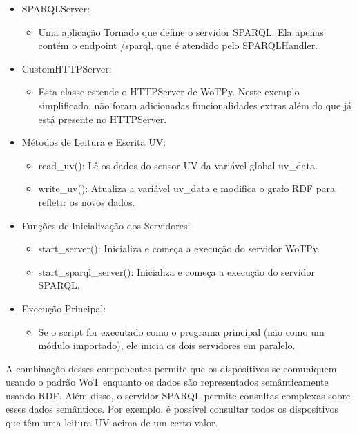 \begin{itemize}
\begin{itemize}
        \end{itemize}
    \item SPARQLServer:
        \begin{itemize}
            \item Uma aplicação Tornado que define o servidor SPARQL. Ela apenas contém o endpoint /sparql, que é atendido pelo SPARQLHandler.
        \end{itemize}
    \item CustomHTTPServer:
        \begin{itemize}
            \item Esta classe estende o HTTPServer de WoTPy. Neste exemplo simplificado, não foram adicionadas funcionalidades extras além do que já está presente no HTTPServer.
        \end{itemize}
    \item Métodos de Leitura e Escrita UV:
        \begin{itemize}
            \item read\_uv(): Lê os dados do sensor UV da variável global uv\_data.
            \item write\_uv(): Atualiza a variável uv\_data e modifica o grafo RDF para refletir os novos dados.
        \end{itemize}
    \item Funções de Inicialização dos Servidores:
        \begin{itemize}
            \item start\_server(): Inicializa e começa a execução do servidor WoTPy.
            \item start\_sparql\_server(): Inicializa e começa a execução do servidor SPARQL.
        \end{itemize}
    \item Execução Principal:
        \begin{itemize}
            \item Se o script for executado como o programa principal (não como um módulo importado), ele inicia os dois servidores em paralelo.
        \end{itemize}
\end{itemize}

A combinação desses componentes permite que os dispositivos se comuniquem usando o padrão WoT enquanto os dados são representados semânticamente usando RDF. Além disso, o servidor SPARQL permite consultas complexas sobre esses dados semânticos. Por exemplo, é possível consultar todos os dispositivos que têm uma leitura UV acima de um certo valor.


